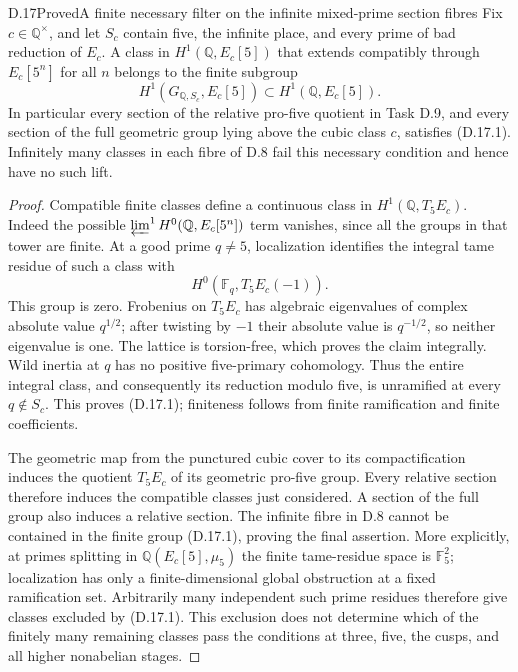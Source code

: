 \begin{statement}{D.17}{Proved}{A finite necessary filter on the infinite mixed-prime section fibres}
Fix \(c\in\mathbb Q^\times\), and let \(S_c\) contain
five, the infinite place, and every prime of bad
reduction of \(E_c\). A class in
\(H^1(\mathbb Q,E_c[5])\) that extends compatibly
through \(E_c[5^n]\) for all \(n\) belongs to the
finite subgroup
\[
 H^1(G_{\mathbb Q,S_c},E_c[5])
       \subset H^1(\mathbb Q,E_c[5]).                    \tag{D.17.1}
\]
In particular every section of the relative pro-five
quotient in Task D.9, and every section of the full
geometric group lying above the cubic class \(c\),
satisfies (D.17.1). Infinitely many classes in each
fibre of D.8 fail this necessary condition and hence
have no such lift.
\end{statement}
\begin{proof}
Compatible finite classes define a continuous class in
\(H^1(\mathbb Q,T_5E_c)\). Indeed the possible
\(\varprojlim^1H^0(\mathbb Q,E_c[5^n])\) term vanishes,
since all the groups in that tower are finite. At a
good prime \(q\ne5\), localization identifies the
integral tame residue of such a class with
\[
 H^0(\mathbb F_q,T_5E_c(-1)).                            \tag{D.17.2}
\]
This group is zero. Frobenius on \(T_5E_c\) has
algebraic eigenvalues of complex absolute value
\(q^{1/2}\); after twisting by \(-1\) their absolute
value is \(q^{-1/2}\), so neither eigenvalue is one.
The lattice is torsion-free, which proves the claim
integrally. Wild inertia at \(q\) has no positive
five-primary cohomology. Thus the entire integral
class, and consequently its reduction modulo five,
is unramified at every \(q\notin S_c\). This proves
(D.17.1); finiteness follows from finite ramification
and finite coefficients.

The geometric map from the punctured cubic cover
to its compactification induces the quotient
\(T_5E_c\) of its geometric pro-five group. Every
relative section therefore induces the compatible
classes just considered. A section of the full group
also induces a relative section. The infinite fibre
in D.8 cannot be contained in the finite group
(D.17.1), proving the final assertion. More explicitly,
at primes splitting in
\(\mathbb Q(E_c[5],\mu_5)\) the finite tame-residue
space is \(\mathbb F_5^2\); localization has only a
finite-dimensional global obstruction at a fixed
ramification set. Arbitrarily many independent such
prime residues therefore give classes excluded by
(D.17.1). This exclusion does not determine which
of the finitely many remaining classes pass the
conditions at three, five, the cusps, and all higher
nonabelian stages.
\end{proof}

